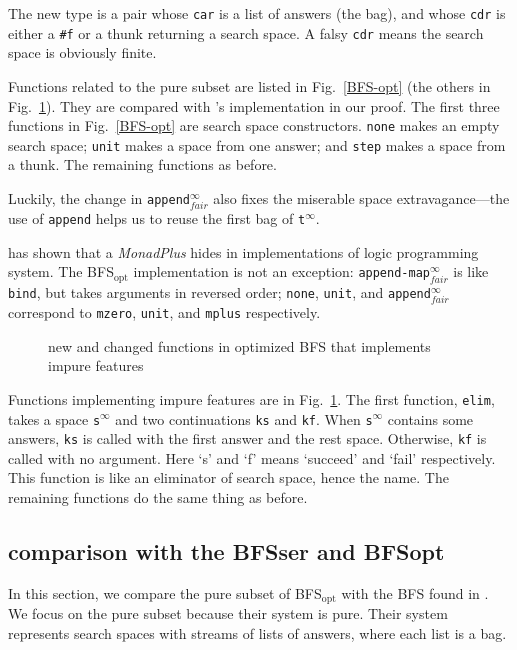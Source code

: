 \documentclass[format=acmlarge, review=true, authordraft=true]{acmart}
\newcommand{\BFSopt}[0]{BFS$_\textrm{opt}$}
\begin{document}
The new type is a pair whose \texttt{car} is a list of answers (the bag), and 
whose \texttt{cdr} is either a \texttt{\#{}f} or a thunk returning a search 
space. A falsy \texttt{cdr} means the search space is obviously finite. 

Functions related to the pure subset are listed in Fig.~\ref{BFS-opt} (the 
others in Fig.~\ref{BFS-opt-cont}). They are compared with 
\citeauthor{seres1999algebra}'s implementation in our proof. The first three 
functions in Fig.~\ref{BFS-opt} are search space constructors. \texttt{none} 
makes an empty search space; \texttt{unit} makes a space from one answer; and 
\texttt{step} makes a space from a thunk. The remaining functions as before.

Luckily, the change in \texttt{append$^\infty_{fair}$} also fixes the miserable 
space 
extravagance---the use of \texttt{append} helps us to reuse the first bag of 
\texttt{t$^\infty$}.

\citet{kiselyov2005backtracking} has shown that a \emph{MonadPlus} hides in 
implementations of logic programming system. The \BFSopt{} implementation is not 
an exception: \texttt{append-map$^\infty_{fair}$} is like \texttt{bind}, 
but takes arguments in reversed order; \texttt{none}, \texttt{unit}, and 
\texttt{append$^\infty_{fair}$} correspond to \texttt{mzero}, \texttt{unit}, 
and \texttt{mplus} respectively.

\begin{figure}
		
	\caption{new and changed functions in optimized BFS that implements impure 
		features}
	\label{BFS-opt-cont}
\end{figure}

Functions implementing impure features are in Fig.~\ref{BFS-opt-cont}. The 
first function, \texttt{elim}, takes a space \texttt{s$^\infty$} and two 
continuations \texttt{ks} and \texttt{kf}. When \texttt{s$^\infty$} contains 
some 
answers, \texttt{ks} is called with the first answer and the rest space. 
Otherwise, \texttt{kf} is called with no argument. Here `s' and `f' means 
`succeed' and `fail' respectively. This function is like an eliminator of 
search space, hence the name. The remaining functions do the same thing as 
before.

\subsection{comparison with the BFSser and BFSopt}

In this section, we compare the pure subset of \BFSopt{} with the BFS 
found in \citet{seres1999algebra}. We focus on the pure subset because 
their system is pure. Their system represents search spaces with streams of 
lists of answers, where each list is a bag.
\end{document}
